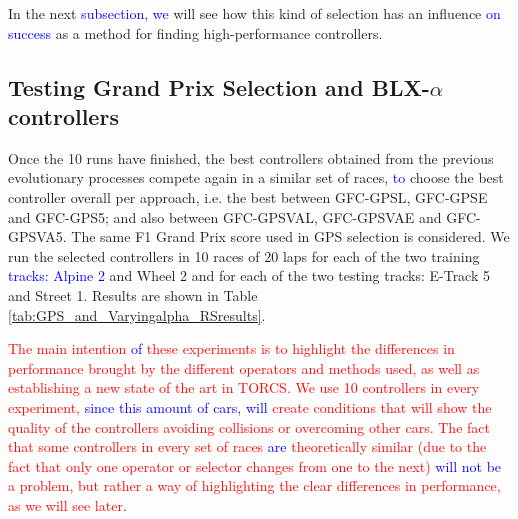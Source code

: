 \documentclass[10pt,journal,compsoc]{IEEEtran}
\begin{document}
In the next  \textcolor{blue}{subsection, we} will see how this kind of selection has an influence \textcolor{blue}{on success} as a method for finding high-performance controllers.



\subsection{Testing Grand Prix Selection and BLX-$\alpha$ controllers}

Once the 10 runs have finished, the best controllers obtained from the
previous evolutionary processes compete again in a similar set of
races,  \textcolor{blue}{to} choose the best controller overall per approach,
i.e. the best between {\sf GFC-GPSL}, {\sf GFC-GPSE} and {\sf
  GFC-GPS5}; and also between {\sf GFC-GPSVAL}, {\sf GFC-GPSVAE} and
{\sf GFC-GPSVA5}. The same F1 Grand Prix score used in GPS selection
is considered. We run the selected controllers in 10 races of 20 laps
for each of the two training  \textcolor{blue}{tracks: Alpine 2}  and Wheel 2  and  for
each of the two testing tracks: E-Track 5 and Street 1. Results are
shown in Table \ref{tab:GPS_and_Varyingalpha_RSresults}.

\textcolor{red}{The main intention \textcolor{blue}{of} these experiments is to
  highlight the differences in performance brought by the different
  operators and methods used, as well as establishing a new state of
  the art in TORCS. We use 10 controllers in every experiment,  \textcolor{blue}{since
  this amount of cars, will} create conditions that will show the
  quality of the controllers avoiding collisions or overcoming other
  cars. The fact that some controllers in every set of races  \textcolor{blue}{are} theoretically similar (due to the fact that only one operator or selector changes from one to the next)  \textcolor{blue}{will not be} a problem, but rather a way of highlighting the clear differences in
  performance, as we will see later}.
\end{document}
